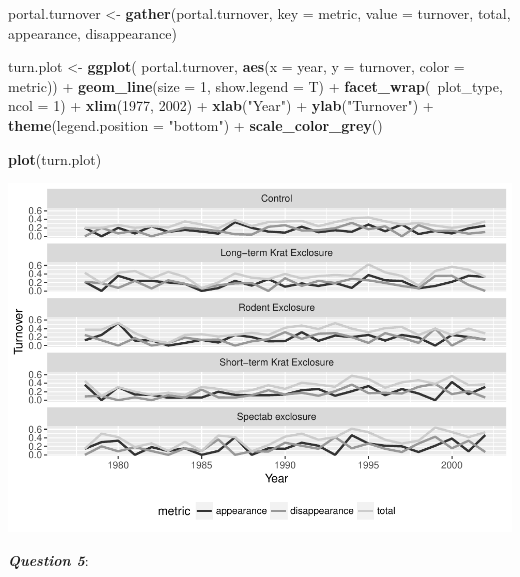 \documentclass[]{article}
\newenvironment{Shaded}{\begin{snugshade}}{\end{snugshade}}
\newcommand{\KeywordTok}[1]{\textcolor[rgb]{0.13,0.29,0.53}{\textbf{{#1}}}}
\newcommand{\DataTypeTok}[1]{\textcolor[rgb]{0.13,0.29,0.53}{{#1}}}
\newcommand{\DecValTok}[1]{\textcolor[rgb]{0.00,0.00,0.81}{{#1}}}
\newcommand{\StringTok}[1]{\textcolor[rgb]{0.31,0.60,0.02}{{#1}}}
\newcommand{\NormalTok}[1]{{#1}}
\begin{document}
\begin{Shaded}
\begin{Highlighting}[]
\NormalTok{portal.turnover <-}\StringTok{ }\KeywordTok{gather}\NormalTok{(portal.turnover, }\DataTypeTok{key =} \NormalTok{metric, }\DataTypeTok{value =} \NormalTok{turnover,}
                          \NormalTok{total, appearance, disappearance)}

\NormalTok{turn.plot <-}\StringTok{ }\KeywordTok{ggplot}\NormalTok{(}
  \NormalTok{portal.turnover, }\KeywordTok{aes}\NormalTok{(}\DataTypeTok{x =} \NormalTok{year, }\DataTypeTok{y =} \NormalTok{turnover, }\DataTypeTok{color =} \NormalTok{metric)) +}
\StringTok{  }\KeywordTok{geom_line}\NormalTok{(}\DataTypeTok{size =} \DecValTok{1}\NormalTok{, }\DataTypeTok{show.legend =} \NormalTok{T) +}
\StringTok{  }\KeywordTok{facet_wrap}\NormalTok{(~plot_type, }\DataTypeTok{ncol =} \DecValTok{1}\NormalTok{) +}
\StringTok{  }\KeywordTok{xlim}\NormalTok{(}\DecValTok{1977}\NormalTok{, }\DecValTok{2002}\NormalTok{) +}
\StringTok{  }\KeywordTok{xlab}\NormalTok{(}\StringTok{"Year"}\NormalTok{) +}
\StringTok{  }\KeywordTok{ylab}\NormalTok{(}\StringTok{"Turnover"}\NormalTok{) +}
\StringTok{  }\KeywordTok{theme}\NormalTok{(}\DataTypeTok{legend.position =} \StringTok{"bottom"}\NormalTok{) +}
\StringTok{  }\KeywordTok{scale_color_grey}\NormalTok{()}

\KeywordTok{plot}\NormalTok{(turn.plot)}
\end{Highlighting}
\end{Shaded}

\includegraphics{temporal_assignment_files/figure-latex/unnamed-chunk-6-1.pdf}

\textbf{\emph{Question 5}}:
\end{document}
